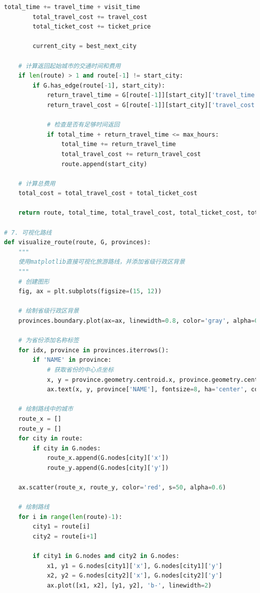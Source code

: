 \documentclass[withoutpreface,bwprint]{cumcmthesis} %
\begin{document}
\begin{appendices}
\begin{lstlisting}[language=python]
        total_time += travel_time + visit_time
        total_travel_cost += travel_cost
        total_ticket_cost += ticket_price
        
        current_city = best_next_city
    
    # 计算返回起始城市的交通时间和费用
    if len(route) > 1 and route[-1] != start_city:
        if G.has_edge(route[-1], start_city):
            return_travel_time = G[route[-1]][start_city]['travel_time']
            return_travel_cost = G[route[-1]][start_city]['travel_cost']
            
            # 检查是否有足够时间返回
            if total_time + return_travel_time <= max_hours:
                total_time += return_travel_time
                total_travel_cost += return_travel_cost
                route.append(start_city)
    
    # 计算总费用
    total_cost = total_travel_cost + total_ticket_cost
    
    return route, total_time, total_travel_cost, total_ticket_cost, total_cost, G

# 7. 可视化路线
def visualize_route(route, G, provinces):
    """
    使用matplotlib直接可视化旅游路线，并添加省级行政区背景
    """
    # 创建图形
    fig, ax = plt.subplots(figsize=(15, 12))
    
    # 绘制省级行政区背景
    provinces.boundary.plot(ax=ax, linewidth=0.8, color='gray', alpha=0.5)
    
    # 为省份添加名称标签
    for idx, province in provinces.iterrows():
        if 'NAME' in province:
            # 获取省份的中心点坐标
            x, y = province.geometry.centroid.x, province.geometry.centroid.y
            ax.text(x, y, province['NAME'], fontsize=8, ha='center', color='gray', alpha=0.7)
    
    # 绘制路线中的城市
    route_x = []
    route_y = []
    for city in route:
        if city in G.nodes:
            route_x.append(G.nodes[city]['x'])
            route_y.append(G.nodes[city]['y'])
    
    ax.scatter(route_x, route_y, color='red', s=50, alpha=0.6)
    
    # 绘制路线
    for i in range(len(route)-1):
        city1 = route[i]
        city2 = route[i+1]
        
        if city1 in G.nodes and city2 in G.nodes:
            x1, y1 = G.nodes[city1]['x'], G.nodes[city1]['y']
            x2, y2 = G.nodes[city2]['x'], G.nodes[city2]['y']
            ax.plot([x1, x2], [y1, y2], 'b-', linewidth=2)
    

\end{lstlisting}
\end{appendices}
\end{document}
